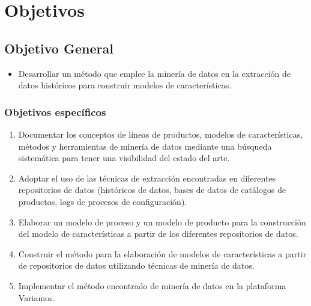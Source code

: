 \chapter*{Objetivos}

\section*{Objetivo General}
\begin{itemize}
\item Desarrollar un método que emplee la minería de datos en la extracción de datos históricos para construir modelos de características.
\end{itemize}

\subsection*{Objetivos específicos}
\begin{enumerate}
\item Documentar los conceptos de líneas de productos, modelos de características, métodos y herramientas de minería de datos mediante una búsqueda sistemática para tener una visibilidad del estado del arte.
\item Adoptar el uso de las técnicas de extracción encontradas en diferentes repositorios de datos (históricos de datos, bases de datos de catálogos de productos, logs de procesos de configuración).
\item Elaborar un modelo de proceso y un modelo de producto para la construcción del modelo de características a partir de los diferentes repositorios de datos.
\item Construir el método para la elaboración de modelos de características a partir de repositorios de datos utilizando técnicas de minería de datos.
\item Implementar el método encontrado de minería de datos en la plataforma Variamos.
\end{enumerate}


